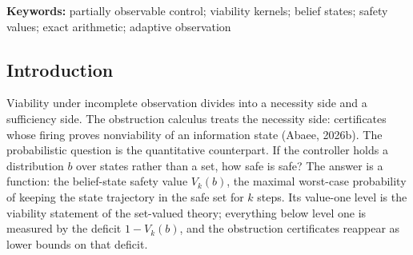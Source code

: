 \documentclass[10pt,twocolumn]{article}
\theoremstyle{plain}
\theoremstyle{definition}
\theoremstyle{remark}
\begin{document}
\begin{abstract}
\(\subseteq\) fully observed orders the values, and both gaps are
realized exactly --- the value of flexibility on the timing cells and the
value of observation on the common-action cells, each \(\tfrac{1}{2}\) at
the symmetric prior and zero elsewhere. Fourth, agreement and
stabilization: the segment-form enumeration reproduces the closed forms
on all 48 audited cells and horizons \(k \le 4\), the certificate
partition coincides with the value boundaries, the hold-class value jumps
by exactly \(\tfrac{1}{2}\) at \(z_{0} = 1 + \min(k, T_{\mathrm{obs}})\),
the two classes differ exactly where
\(2 \le z_{0} < 1 + \min(k, T_{\mathrm{obs}})\) (on the audited grid,
exactly the timing cells, 36 combinations), and the value is frozen once
\(k \ge T_{\mathrm{obs}}\) on the finite survivable-set lattice, so the
audited tables are complete. Fifth, a genuinely stochastic layer: an
exact weighted-path deficit identity under noisy observation --- the
deficit is the prior mass weighted by fatal-reading probabilities, and a
two-state sensor instance attains deficit \(1/20\) against a minimal mass
of \(1/2\), so the min-mass bound is not universal there --- a
noisy-probe deadline family with three-valued exact values, and the
repetition trade-off: a second probe cuts the misread probability from
\(1/10\) to \(7/250\), and each probe step costs \(1/10\) of floor
margin. Every closed form is verified against brute-force enumeration
from the definitions, including a seeded randomized battery.
\end{abstract}

\textbf{Keywords:} partially observable control; viability kernels;
belief states; safety values; exact arithmetic; adaptive observation

\subsection{Introduction}\label{introduction}

Viability under incomplete observation divides into a necessity side and a
sufficiency side. The obstruction calculus treats the necessity side:
certificates whose firing proves nonviability of an information state
(Abaee, 2026b). The probabilistic question is the quantitative counterpart.
If the controller holds a distribution \(b\) over states rather than a set,
how safe is safe? The answer is a function: the belief-state safety value
\(V_{k}(b)\), the maximal worst-case probability of keeping the state
trajectory in the safe set for \(k\) steps. Its value-one level is the
viability statement of the set-valued theory; everything below level one
is measured by the deficit \(1 - V_{k}(b)\), and the obstruction
certificates reappear as lower bounds on that deficit.
\end{document}
